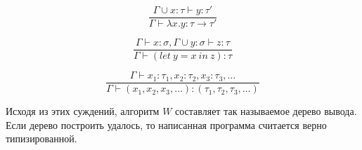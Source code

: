 \begin{equation}
    \label{eq:abs}
    \tag{ABS}
    \frac{\Gamma \cup x: \tau \vdash y: \tau'}{\Gamma \vdash \lambda x. y : \tau \to \tau'}
\end{equation}

\begin{equation}
    \label{eq:let}
    \tag{LET}
    \frac{\Gamma \vdash x: \sigma, \Gamma \cup y: \sigma \vdash z: \tau}{\Gamma \vdash (let ~ y = x ~ in ~ z): \tau}
\end{equation}

\begin{equation}
    \label{eq:tuple}
    \tag{TUPLE}
    \frac{\Gamma \vdash x_1: \tau_1, x_2: \tau_2, x_3: \tau_3, \ldots}{\Gamma \vdash (x_1, x_2, x_3, \ldots): (\tau_1, \tau_2, \tau_3, \ldots)}
\end{equation}

Исходя из этих суждений, алгоритм $W$ составляет так называемое дерево вывода.
Если дерево построить удалось, то написанная программа считается верно типизированной.


